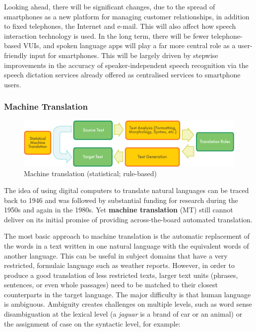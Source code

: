 \begin{multicols}{2}
Looking ahead, there will be significant changes, due to the spread of smartphones as a new platform for managing customer relationships, in addition to fixed telephones, the Internet and e-mail. This will also affect how speech interaction technology is used. In the long term, there will be fewer telephone-based VUIs, and spoken language apps will play a far more central role as a user-friendly input for smartphones. This will be largely driven by stepwise improvements in the accuracy of speaker-independent speech recognition via the speech dictation services already offered as centralised services to smartphone users.

\subsubsection{Machine Translation}

\begin{figure}[htb]
  \center
  \includegraphics[width=\textwidth]{../_media/english/machine_translation}
  \caption{Machine translation (statistical; rule-based)}
  \label{fig:mtarch_en}
\end{figure}

The idea of using digital computers to translate natural languages can be traced back to 1946 and was followed by substantial funding for research during the 1950s and again in the 1980s. 
Yet \textbf{machine translation} (MT) still cannot deliver on its initial promise of providing across-the-board automated translation.  


The most basic approach to machine translation is the automatic replacement of the words in a text written in one natural language with the equivalent words of another language. This can be useful in subject domains that have a very restricted, formulaic language such as weather reports.
However, in order to produce a good translation of less restricted texts, larger text units (phrases, sentences, or even whole passages) need to be matched to their closest counterparts in the target language. The major difficulty is that human language is ambiguous. Ambiguity creates challenges on multiple levels, such as word sense disambiguation at the lexical level (a \textit{jaguar} is a brand of car or an animal) or the assignment of case on the syntactic level, for example:


\end{multicols}
